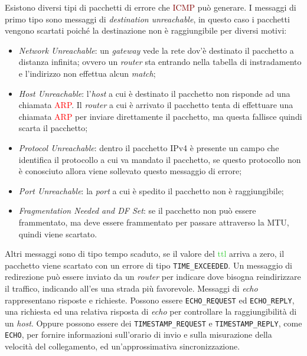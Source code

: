 \documentclass{article}
\numberwithin{equation}{subsection}
\begin{document}
Esistono diversi tipi di pacchetti di errore che \textcolor{Maroon}{ICMP} può generare. 
I messaggi di primo tipo sono messaggi di \textit{destination unreachable}, in questo caso i pacchetti vengono scartati poiché la destinazione non è raggiungibile per diversi 
motivi:
\begin{itemize}
    \item \textit{Network Unreachable}: un \textit{gateway} vede la rete dov'è destinato il pacchetto a distanza infinita; ovvero un \textit{router} sta entrando nella tabella di instradamento e l'indirizzo non effettua alcun \textit{match};
    \item \textit{Host Unreachable}: l'\textit{host} a cui è destinato il pacchetto non risponde ad una chiamata \textcolor{Red}{ARP}. Il \textit{router} a cui è arrivato il pacchetto tenta di effettuare una chiamata \textcolor{Red}{ARP} per inviare direttamente il pacchetto, ma questa fallisce quindi scarta il pacchetto;
    \item \textit{Protocol Unreachable}: dentro il pacchetto \textcolor{BurntOrange}{IPv4} è presente un campo che identifica il protocollo a cui va mandato il pacchetto, se questo protocollo non è conosciuto allora viene sollevato questo messaggio di errore;
    \item \textit{Port Unreachable}: la \textit{port} a cui è spedito il pacchetto non è raggiungibile;
    \item \textit{Fragmentation Needed and DF Set}: se il pacchetto non può essere frammentato, ma  deve essere frammentato per passare attraverso la \textcolor{RoyalPurple}{MTU}, quindi viene scartato. 
\end{itemize}

Altri messaggi sono di tipo tempo scaduto, se il valore del \textcolor{LimeGreen}{ttl} arriva a zero, il pacchetto viene scartato con un errore di tipo \verb|TIME_EXCEEDED|. 
Un messaggio di redirezione può essere inviato da un \textit{router} per indicare dove bisogna reindirizzare il traffico, indicando all'\textcolor{Periwinkle}{es} una strada più favorevole. 
Messaggi di \textit{echo} rappresentano risposte e richieste. Possono essere \verb|ECHO_REQUEST| ed \verb|ECHO_REPLY|, una richiesta ed una relativa risposta di \textit{echo} per controllare 
la raggiungibilità di un \textit{host}. Oppure possono essere dei \verb|TIMESTAMP_REQUEST| e \verb|TIMESTAMP_REPLY|, come \texttt{ECHO}, per fornire informazioni sull'orario di invio e sulla misurazione della velocità del collegamento, ed un'approssimativa sincronizzazione. 
\end{document}

